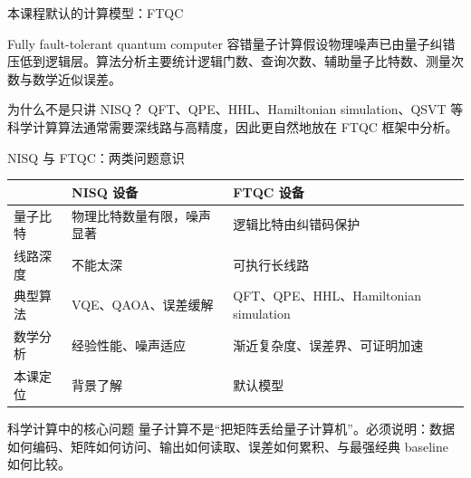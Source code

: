 \documentclass[aspectratio=169,10pt]{ctexbeamer}
\begin{document}
\begin{frame}{本课程默认的计算模型：FTQC}
\begin{center}
\end{center}
\begin{keybox}{Fully fault-tolerant quantum computer}
容错量子计算假设物理噪声已由量子纠错压低到逻辑层。算法分析主要统计逻辑门数、查询次数、辅助量子比特数、测量次数与数学近似误差。
\end{keybox}
\begin{warnbox}{为什么不是只讲 NISQ？}
QFT、QPE、HHL、Hamiltonian simulation、QSVT 等科学计算算法通常需要深线路与高精度，因此更自然地放在 FTQC 框架中分析。
\end{warnbox}
\end{frame}

\begin{frame}{NISQ 与 FTQC：两类问题意识}
\begin{center}
\renewcommand{\arraystretch}{1.15}
\begin{tabular}{p{}p{}p{}}
\toprule
& \textbf{NISQ 设备} & \textbf{FTQC 设备}\\
\midrule
量子比特 & 物理比特数量有限，噪声显著 & 逻辑比特由纠错码保护\\
线路深度 & 不能太深 & 可执行长线路\\
典型算法 & VQE、QAOA、误差缓解 & QFT、QPE、HHL、Hamiltonian simulation\\
数学分析 & 经验性能、噪声适应 & 渐近复杂度、误差界、可证明加速\\
本课定位 & 背景了解 & 默认模型\\
\bottomrule
\end{tabular}
\end{center}
\vspace{2mm}
\begin{keybox}{科学计算中的核心问题}
量子计算不是“把矩阵丢给量子计算机”。必须说明：数据如何编码、矩阵如何访问、输出如何读取、误差如何累积、与最强经典 baseline 如何比较。
\end{keybox}
\end{frame}
\end{document}
